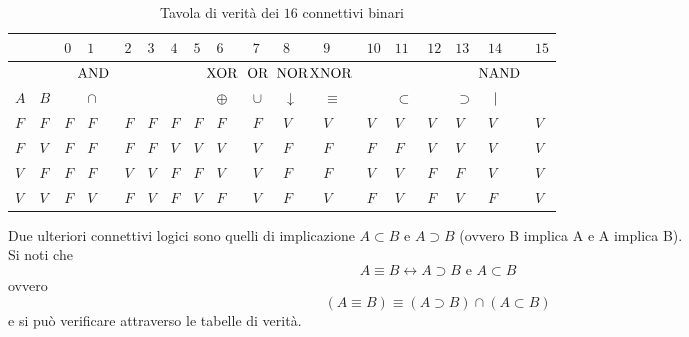 \documentclass[a4paper]{extarticle}
\renewcommand\arraystretch{}
\begin{document}
\begin{table}[H]
    \centering
    \setlength{\tabcolsep}{10pt}
    \renewcommand{\arraystretch}{1.4}
    \begin{tabularx}{\textwidth}{>{\textwidth}PP|PPPPPPPP>{\textwidth}PPPPPPPP}
         $ $ & $ $ & $0$ & $1$ & $2$ & $3$ & $4$ & $5$ & $6$ & $7$ & $8$ & $9$ & $10$ & $11$ & $12$ & $13$ & $14$ & $15$\\
         \hline
         $ $ & $ $ & $ $ & $\hspace{-0.7em} \text{AND}$ & $ $ & $ $ & $ $ & $ $ & $\hspace{-0.75em} \text{XOR}$ & $\hspace{-0.45em}  \text{OR}$ & $\hspace{-0.5em} \text{NOR}$ & $\hspace{-1em} \text{XNOR}$ & $ $ & $ $ & $ $ & $ $ & $\hspace{-0.75em} \text{NAND}$ & $ $\\
         $A$ & $B$ & $ $ & $\cap$ & $ $ & $ $ & $ $ & $ $ & $\oplus$ & $\cup$ & $\downarrow$ & $\equiv$ & $ $ & $\subset$ & $ $ & $\supset$ & $\hspace{0.4em} \vert$ & $ $\\
         \hline
         $F$ & $F$ & $F$ & $F$ & $F$ & $F$ & $F$ & $F$ & $F$ & $F$ & $V$ & $V$ & $V$ & $V$ & $V$ & $V$ & $V$ & $V$\\
         $F$ & $V$ & $F$ & $F$ & $F$ & $F$ & $V$ & $V$ & $V$ & $V$ & $F$ & $F$ & $F$ & $F$ & $V$ & $V$ & $V$ & $V$\\
         $V$ & $F$ & $F$ & $F$ & $V$ & $V$ & $F$ & $F$ & $V$ & $V$ & $F$ & $F$ & $V$ & $V$ & $F$ & $F$ & $V$ & $V$\\
         $V$ & $V$ & $F$ & $V$ & $F$ & $V$ & $F$ & $V$ & $F$ & $V$ & $F$ & $V$ & $F$ & $V$ & $F$ & $V$ & $F$ & $V$\\
    \end{tabularx}
    \caption{Tavola di verità dei $16$ connettivi binari}
    \label{tab:tavola_verità_connettivi_binari}
\end{table}

\noindent
Due ulteriori connettivi logici sono quelli di implicazione \(A \subset B\) e \(A \supset B\) (ovvero B implica A e A implica B).\\
Si noti che
\[A \equiv B \leftrightarrow A \supset B \text{ e } A \subset B\]
ovvero
\[(A \equiv B) \equiv (A \supset B) \cap (A \subset B)\]
e si può verificare attraverso le tabelle di verità.
\end{document}
